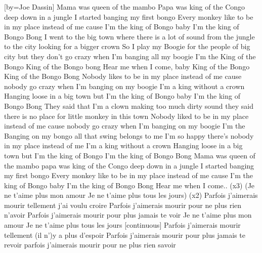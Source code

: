 [by={Joe Dassin}]
\beginverse*
\nolyrics{Repeat Chords: \[Dm] \[G] \[Am] }
\endverse
\beginverse
Mama was queen of the mambo
Papa was king of the Congo
deep down in a jungle
I started banging my first bongo
\endverse
\beginverse
Every monkey like to be
in my place instead of me
cause I'm the king of Bongo
baby I'm the king of Bongo Bong
\endverse
\beginverse
I went to the big town
where there is a lot of sound
from the jungle to the city
looking for a bigger crown
\endverse
\beginverse
So I play my Boogie
for the people of big city
but they don't go crazy
when I'm banging all my boogie
I'm the
\endverse
\beginchorus
King of the Bongo
King of the Bongo bong
Hear me when I come, baby
King of the Bongo
King of the Bongo Bong
\endchorus
\beginverse
Nobody likes to be
in my place instead of me
cause nobody go crazy
when I'm banging on my boogie
\endverse
\beginverse
I'm a king without a crown
Hanging loose in a big town
but I'm the king of Bongo
baby I'm the king of Bongo Bong
\endverse
{}
\beginverse
They said that I'm a clown
making too much dirty sound
they said there is no place
for little monkey in this town
\endverse
\beginverse
Nobody liked to be
in my place instead of me
cause nobody go crazy
when I'm banging on my boogie
I'm the
\endverse
{}
\beginverse
Banging on my bongo
all that swing belongs to me
I'm so happy there's nobody
in my place instead of me
\endverse
\beginverse
I'm a king without a crown
Hanging loose in a big town
but I'm the king of Bongo
I'm the king of Bongo Bong
\endverse
{}
\beginverse
Mama was queen of the mambo
papa was king of the Congo
deep down in a jungle
I started banging my first bongo
\endverse
\beginverse
Every monkey like to be
in my place instead of me
cause I'm the king of Bongo
baby I'm the king of Bongo Bong
\endverse
\beginverse*
Hear me when I come.. (x3)
\endverse
\beginverse
(Je ne t'aime plus mon amour
Je ne t'aime plus tous les jours) (x2)
\endverse
\beginverse
Parfois j'aimerais mourir tellement j'ai voulu croire
Parfois j'aimerais mourir pour ne plus rien n'avoir
Parfois j'aimerais mourir pour plus jamais te voir
\endverse
\beginverse
Je ne t'aime plus mon amour
Je ne t'aime plus tous les jours [continuous]
\endverse
\beginverse
Parfois j'aimerais mourir tellement
(il n')y a plus d'espoir
Parfois j'aimerais mourir pour plus jamais te revoir
parfois j'aimerais mourir pour ne plus rien savoir
\endverse
